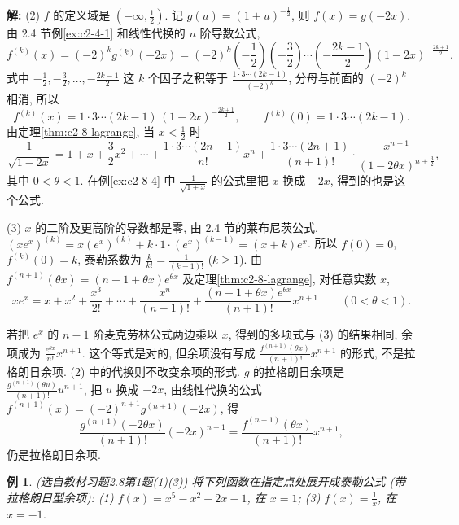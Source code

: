 \documentclass[UTF8,openany]{ctexbook}
\theoremstyle{chinesetextbook}
\newtheorem{example}{例}[section]
\newenvironment{cnsolution}{\par\indent\textbf{解:} \ignorespaces}{\par}
\begin{document}
\begin{cnsolution}
(2) $f$ 的定义域是 $\displaystyle\left(-\infty,\frac12\right)$. 记 $g(u)=(1+u)^{-\frac12}$, 则 $f(x)=g(-2x)$. 由 2.4 节例\ref{ex:c2-4-1} 和线性代换的 $n$ 阶导数公式,
\[
f^{(k)}(x)=(-2)^kg^{(k)}(-2x)=(-2)^k\left(-\frac12\right)\left(-\frac32\right)\cdots\left(-\frac{2k-1}2\right)(1-2x)^{-\frac{2k+1}2}.
\]
式中 $\displaystyle-\frac12,-\frac32,\ldots,-\frac{2k-1}2$ 这 $k$ 个因子之积等于 $\displaystyle\frac{1\cdot3\cdots(2k-1)}{(-2)^k}$, 分母与前面的 $(-2)^k$ 相消, 所以
\[
f^{(k)}(x)=1\cdot3\cdots(2k-1)\,(1-2x)^{-\frac{2k+1}2},\qquad f^{(k)}(0)=1\cdot3\cdots(2k-1).
\]
由定理\ref{thm:c2-8-lagrange}, 当 $\displaystyle x<\frac12$ 时
\[
\frac1{\sqrt{1-2x}}=1+x+\frac32x^2+\cdots+\frac{1\cdot3\cdots(2n-1)}{n!}x^n+\frac{1\cdot3\cdots(2n+1)}{(n+1)!}\cdot\frac{x^{n+1}}{(1-2\theta x)^{n+\frac32}},
\]
其中 $0<\theta<1$. 在例\ref{ex:c2-8-4} 中 $\displaystyle\frac1{\sqrt{1+x}}$ 的公式里把 $x$ 换成 $-2x$, 得到的也是这个公式.

(3) $x$ 的二阶及更高阶的导数都是零, 由 2.4 节的莱布尼茨公式, $(xe^x)^{(k)}=x(e^x)^{(k)}+k\cdot1\cdot(e^x)^{(k-1)}=(x+k)e^x$. 所以 $f(0)=0$, $f^{(k)}(0)=k$, 泰勒系数为 $\displaystyle\frac k{k!}=\frac1{(k-1)!}$ ($k\ge1$). 由 $f^{(n+1)}(\theta x)=(n+1+\theta x)e^{\theta x}$ 及定理\ref{thm:c2-8-lagrange}, 对任意实数 $x$,
\[
xe^x=x+x^2+\frac{x^3}{2!}+\cdots+\frac{x^n}{(n-1)!}+\frac{(n+1+\theta x)e^{\theta x}}{(n+1)!}x^{n+1}\qquad(0<\theta<1).
\]
\end{cnsolution}
若把 $e^x$ 的 $n-1$ 阶麦克劳林公式两边乘以 $x$, 得到的多项式与 (3) 的结果相同, 余项成为 $\displaystyle\frac{e^{\theta x}}{n!}x^{n+1}$. 这个等式是对的, 但余项没有写成 $\displaystyle\frac{f^{(n+1)}(\theta x)}{(n+1)!}x^{n+1}$ 的形式, 不是拉格朗日余项. (2) 中的代换则不改变余项的形式. $g$ 的拉格朗日余项是 $\displaystyle\frac{g^{(n+1)}(\theta u)}{(n+1)!}u^{n+1}$, 把 $u$ 换成 $-2x$, 由线性代换的公式 $f^{(n+1)}(x)=(-2)^{n+1}g^{(n+1)}(-2x)$, 得
\[
\frac{g^{(n+1)}(-2\theta x)}{(n+1)!}(-2x)^{n+1}=\frac{f^{(n+1)}(\theta x)}{(n+1)!}x^{n+1},
\]
仍是拉格朗日余项.
\begin{example}\label{ex:c2-h8-1}
\textnormal{(选自教材习题2.8第1题(1)(3))} 将下列函数在指定点处展开成泰勒公式 (带拉格朗日型余项): (1) $f(x)=x^5-x^2+2x-1$, 在 $x=1$; (3) $\displaystyle f(x)=\frac1x$, 在 $x=-1$.
\end{example}
\end{document}
